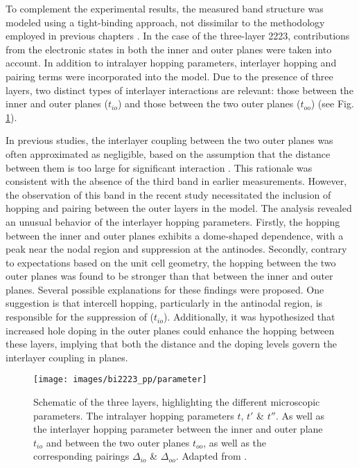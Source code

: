 To complement the experimental results, the measured band structure was modeled using a tight-binding approach, not dissimilar to the methodology employed in previous chapters \cite{luo_subtle_2021}.
In the case of the three-layer 2223, contributions from the electronic states in both the inner and outer  planes were taken into account.
In addition to intralayer hopping parameters, interlayer hopping and pairing terms were incorporated into the model.
Due to the presence of three layers, two distinct types of interlayer interactions are relevant: those between the inner and outer planes ($t_{io}$) and those between the two outer planes ($t_{oo}$) (see Fig. \ref{fig:parameter}).

In previous studies, the interlayer coupling between the two outer planes was often approximated as negligible, based on the assumption that the distance between them is too large for significant interaction \cite{kunisada_observation_2017,ideta_hybridization_2021}.
This rationale was consistent with the absence of the third band in earlier measurements.
However, the observation of this band in the recent study \cite{luo_electronic_2023} necessitated the inclusion of hopping and pairing between the outer layers in the model.
The analysis revealed an unusual behavior of the interlayer hopping parameters.
Firstly, the hopping between the inner and outer planes exhibits a dome-shaped dependence, with a peak near the nodal region and suppression at the antinodes.
Secondly, contrary to expectations based on the unit cell geometry, the hopping between the two outer planes was found to be stronger than that between the inner and outer planes.
Several possible explanations for these findings were proposed.
One suggestion is that intercell hopping, particularly in the antinodal region, is responsible for the suppression of ($t_{io}$).
Additionally, it was hypothesized that increased hole doping in the outer planes could enhance the hopping between these layers, implying that both the distance and the doping levels govern the interlayer coupling in  planes.

\begin{figure}
	\centering
	\texttt{[image: images/bi2223\_pp/parameter]}
	\caption{Schematic of the three  layers, highlighting the different microscopic parameters. The intralayer hopping parameters $t$, $t'$ \& $t''$. As well as the interlayer hopping parameter between the inner and outer plane $t_{io}$ and between the two outer planes $t_{oo}$, as well as the corresponding pairings $\Delta_{io}$ \& $\Delta_{oo}$. Adapted from \cite{luo_electronic_2023}.}
	\label{fig:parameter}
\end{figure}


